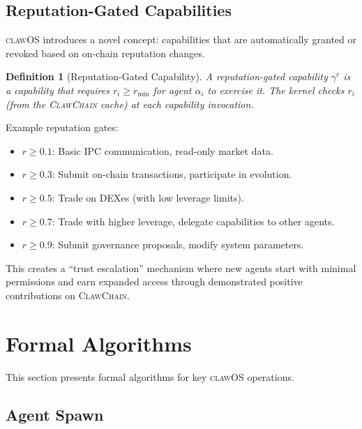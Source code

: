 \documentclass{article}
\newtheorem{definition}{Definition}
\newcommand{\clawos}{\textsc{clawOS}}
\newcommand{\clawchain}{\textsc{ClawChain}}
\begin{document}
\subsection{Reputation-Gated Capabilities}

\clawos{} introduces a novel concept: capabilities that are automatically granted or revoked based on on-chain reputation changes.

\begin{definition}[Reputation-Gated Capability]
A reputation-gated capability $\gamma^{r}$ is a capability that requires $r_i \geq r_{\min}$ for agent $\alpha_i$ to exercise it. The kernel checks $r_i$ (from the \clawchain{} cache) at each capability invocation.
\end{definition}

Example reputation gates:
\begin{itemize}[leftmargin=*]
    \item $r \geq 0.1$: Basic IPC communication, read-only market data.
    \item $r \geq 0.3$: Submit on-chain transactions, participate in evolution.
    \item $r \geq 0.5$: Trade on DEXes (with low leverage limits).
    \item $r \geq 0.7$: Trade with higher leverage, delegate capabilities to other agents.
    \item $r \geq 0.9$: Submit governance proposals, modify system parameters.
\end{itemize}

This creates a ``trust escalation'' mechanism where new agents start with minimal permissions and earn expanded access through demonstrated positive contributions on \clawchain{}.

%
%

\section{Formal Algorithms}
\label{sec:algorithms}

This section presents formal algorithms for key \clawos{} operations.

\subsection{Agent Spawn}
\end{document}
